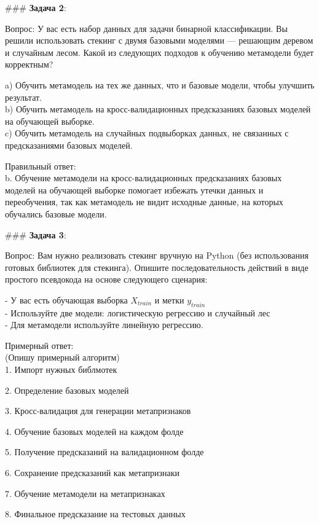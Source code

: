 ### \textbf{Задача 2}: 

Вопрос: У вас есть набор данных для задачи бинарной классификации. Вы решили использовать стекинг с двумя базовыми моделями — решающим деревом и случайным лесом. Какой из следующих подходов к обучению метамодели будет корректным?

a) Обучить метамодель на тех же данных, что и базовые модели, чтобы улучшить результат.  \\
b) Обучить метамодель на кросс-валидационных предсказаниях базовых моделей на обучающей выборке.  \\
c) Обучить метамодель на случайных подвыборках данных, не связанных с предсказаниями базовых моделей.

Правильный ответ:  \\
b. Обучение метамодели на кросс-валидационных предсказаниях базовых моделей на обучающей выборке помогает избежать утечки данных и переобучения, так как метамодель не видит исходные данные, на которых обучались базовые модели.


### \textbf{Задача 3}:

Вопрос: Вам нужно реализовать стекинг вручную на Python (без использования готовых библиотек для стекинга). Опишите последовательность действий в виде простого псевдокода на основе следующего сценария:

- У вас есть обучающая выборка $X_{train}$ и метки $y_{train}$ \\
- Используйте две модели: логистическую регрессию и случайный лес \\
- Для метамодели используйте линейную регрессию.

Примерный ответ:\\
(Опишу примерный алгоритм)\\
1. Импорт нужных библмотек

2. Определение базовых моделей

3. Кросс-валидация для генерации метапризнаков

4. Обучение базовых моделей на каждом фолде
    
5. Получение предсказаний на валидационном фолде
    
6. Сохранение предсказаний как метапризнаки

7. Обучение метамодели на метапризнаках

8. Финальное предсказание на тестовых данных
